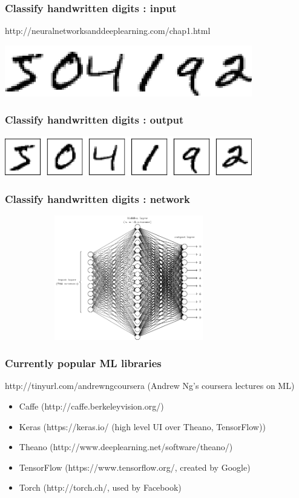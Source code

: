 \documentclass{beamer}
\begin{document}
\begin{frame}
  \frametitle{Classify handwritten digits : input}
  http://neuralnetworksanddeeplearning.com/chap1.html

  \includegraphics[width=10.8cm]{digits.png}
\end{frame}
\begin{frame}
  \frametitle{Classify handwritten digits : output}
  \includegraphics[width=10.8cm]{digits_separate.png}
\end{frame}
\begin{frame}
  \frametitle{Classify handwritten digits : network}
  \includegraphics[height=5.4cm,width=10.8cm]{tikz12.png}
\end{frame}
\begin{frame}
  \frametitle{Currently popular ML libraries}
http://tinyurl.com/andrewngcoursera (Andrew Ng's coursera lectures on ML)

  \begin{itemize}
  \item Caffe (http://caffe.berkeleyvision.org/)
  \item Keras (https://keras.io/ (high level UI over Theano, TensorFlow))
  \item Theano (http://www.deeplearning.net/software/theano/)
  \item TensorFlow (https://www.tensorflow.org/, created by Google)
  \item Torch (http://torch.ch/, used by Facebook)
  \end{itemize}
\end{frame}
\end{document}
